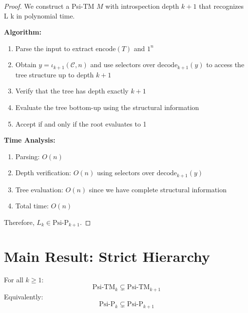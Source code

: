 \begin{proof}
We construct a Psi-TM $M$ with introspection depth $k+1$ that recognizes L k in polynomial time.

\textbf{Algorithm:}
\begin{enumerate}
\item Parse the input to extract $\text{encode}(T)$ and $1^n$
\item Obtain $y=\iota_{k+1}(\mathcal{C},n)$ and use selectors over $\mathrm{decode}_{k+1}(y)$ to access the tree structure up to depth $k{+}1$
\item Verify that the tree has depth exactly $k+1$
\item Evaluate the tree bottom-up using the structural information
\item Accept if and only if the root evaluates to 1
\end{enumerate}

\textbf{Time Analysis:}
\begin{enumerate}
\item Parsing: $O(n)$
\item Depth verification: $O(n)$ using selectors over $\mathrm{decode}_{k+1}(y)$
\item Tree evaluation: $O(n)$ since we have complete structural information
\item Total time: $O(n)$
\end{enumerate}

Therefore, $L_k \in \text{Psi-P}_{k+1}$.
\end{proof}

\section{Main Result: Strict Hierarchy}

\begin{theorem}
\label{thm:strict-hierarchy-2}
For all $k \geq 1$:
$$\text{Psi-TM}_k \subsetneq \text{Psi-TM}_{k+1}$$
Equivalently:
$$\text{Psi-P}_k \subsetneq \text{Psi-P}_{k+1}$$
\end{theorem}

